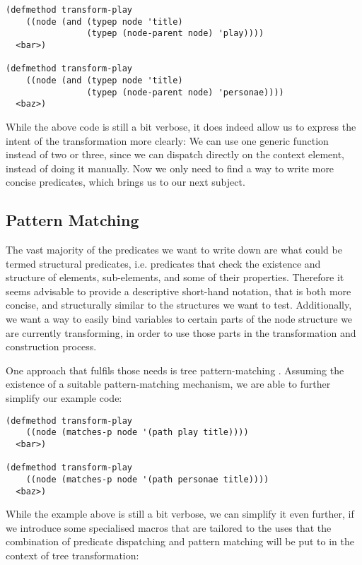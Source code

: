\documentclass[a4paper,11pt]{scrartcl}
\begin{document}
\begin{verbatim}
(defmethod transform-play
    ((node (and (typep node 'title)
                (typep (node-parent node) 'play))))
  <bar>)

(defmethod transform-play
    ((node (and (typep node 'title)
                (typep (node-parent node) 'personae))))
  <baz>)
\end{verbatim}

While the above code is still a bit verbose, it does indeed allow us
to express the intent of the transformation more clearly:  We can use
one generic function instead of two or three, since we can dispatch
directly on the context element, instead of doing it manually.  Now we
only need to find a way to write more concise predicates, which brings
us to our next subject.

\subsection{Pattern Matching}
\label{sec:pattern-matching}

The vast majority of the predicates we want to write down are
what could be termed structural predicates, i.e. predicates that check
the existence and structure of elements, sub-elements, and some of
their properties.  Therefore it seems advisable to provide a
descriptive short-hand notation, that is both more concise, and
structurally similar to the structures we want to test.  Additionally,
we want a way to easily bind variables to certain parts of the node
structure we are currently transforming, in order to use those parts
in the transformation and construction process.

One approach that fulfils those needs is tree pattern-matching
\cite{TPM}.  Assuming the existence of a suitable pattern-matching
mechanism, we are able to further simplify our example code:

\begin{verbatim}
(defmethod transform-play
    ((node (matches-p node '(path play title))))
  <bar>)

(defmethod transform-play
    ((node (matches-p node '(path personae title))))
  <baz>)
\end{verbatim}

While the example above is still a bit verbose, we can simplify it
even further, if we introduce some specialised macros that are
tailored to the uses that the combination of predicate dispatching and
pattern matching will be put to in the context of tree transformation:
\end{document}
